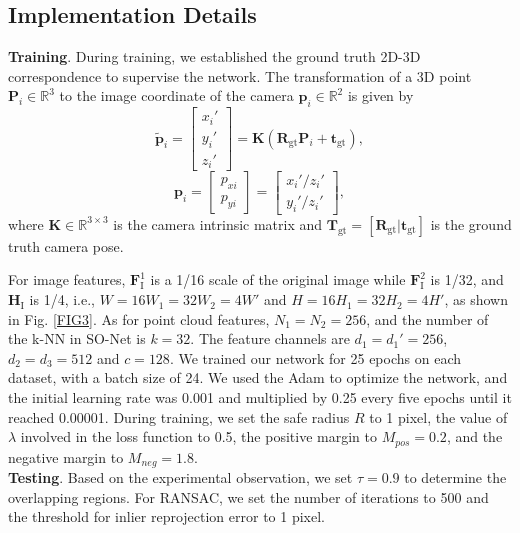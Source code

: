\documentclass[lettersize,journal]{IEEEtran}
\begin{document}
\subsection{Implementation Details}
\noindent\textbf{Training}.
During training, we established the ground truth 2D-3D correspondence to supervise the network. The transformation of a 3D point $\mathbf{P}_i\in \mathbb{R}^3$  to the image coordinate of the camera $\mathbf{p}_{i}\in \mathbb{R}^2$ is given by
\begin{equation}
    \tilde{\mathbf{p}}_{i}=\begin{bmatrix}x_i' \\ y_i' \\ z_i'\end{bmatrix}=\mathbf{K}(\mathbf{R}_\text{gt}\mathbf{P}_{i}+\mathbf{t}_\text{gt}),
 \end{equation}
 \begin{equation}
 \mathbf{p}_{i}=\begin{bmatrix}p_{xi}\\p_{yi} \end{bmatrix}=\begin{bmatrix}x_i'/z_i'\\y_i'/z_i' \end{bmatrix},
 \end{equation}
where $\mathbf{K}\in\mathbb{R}^{3\times3}$ is the camera intrinsic matrix and $\mathbf{T}_\text{gt}=[\mathbf{R}_\text{gt}|\mathbf{t}_\text{gt}]$ is the ground truth camera pose.

For image features, $\mathbf{F}^{1}_\text{I}$ is a 1/16 scale of the original image while $\mathbf{F}^{2}_\text{I}$ is 1/32, and $\mathbf{H}_{\text{I}}$ is 1/4, i.e., $W=16W_1=32W_2=4W'$ and $H=16H_1=32H_2=4H'$, as shown in Fig. \ref{FIG3}. As for point cloud features, $N_1=N_2=256$, and the number of the k-NN in SO-Net \cite{SONET} is $k=32$. The feature channels are $d_1=d_1'=256$, $d_2=d_3=512$ and $c=128$. We trained our network for 25 epochs on each dataset, with a batch size of 24. We used the Adam \cite{ADAM} to optimize the network, and the initial learning rate was 0.001 and multiplied by 0.25 every five epochs until it reached 0.00001. During training, we set the safe radius $R$ to 1 pixel, the value of $\lambda$ involved in the loss function to 0.5, the positive margin to $M_{pos}=0.2$, and the negative margin to $M_{neg}=1.8$. \\


\noindent\textbf{Testing}.
Based on the experimental observation, we set $\tau=0.9$ to determine the overlapping regions. For RANSAC, we set the number of iterations to
500 and the threshold for inlier reprojection error to 1 pixel.
\end{document}
